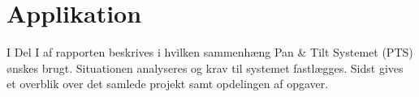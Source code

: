 \cleardoublepage
{}
\setcounter{page}{1}
\part{Applikation}
I Del I af rapporten beskrives i hvilken sammenhæng Pan \& Tilt Systemet (PTS) 
ønskes brugt. Situationen analyseres og krav til systemet fastlægges. Sidst 
gives et overblik over det samlede projekt samt opdelingen af opgaver.



